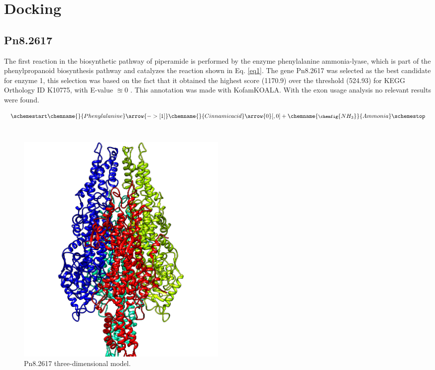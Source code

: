 \documentclass[12pt]{article}
\begin{document}
	
	\section{Docking}
	
	\subsection{Pn8.2617}
	
	The first reaction in the biosynthetic pathway of piperamide is performed by the enzyme phenylalanine ammonia-lyase, which is part of the phenylpropanoid biosynthesis pathway and catalyzes the reaction shown in Eq. \ref{eq1}. The gene Pn8.2617 was selected as the best candidate for enzyme 1, this selection was based on the fact that it obtained the highest score (1170.9) over the threshold (524.93) for KEGG Orthology ID K10775, with E-value $\approxeq 0$ . This annotation was made with KofamKOALA. \cite{kofamkoala} With the exon usage analysis no relevant results were found.
	
	
	\begin{equation}
		\schemestart
		 \label{eq1}
		\chemname{\footnotesize}{Phenylalanine}\arrow{->[ 1]}\chemname{\footnotesize}{Cinnamic acid}
		\arrow{0}[,0]+
		\chemname{\footnotesize\chemfig{NH_3}}{Ammonia}
		\schemestop
	\end{equation}\\
	
	\FloatBarrier
	\begin{figure}
		\centering
		\includegraphics[width=0.5\textwidth]{../1/Minimize/model.png}
		\caption{\centering Pn8.2617 three-dimensional model.}
		\label{fig1_1}
	\end{figure}
	\FloatBarrier
	
\end{document}
